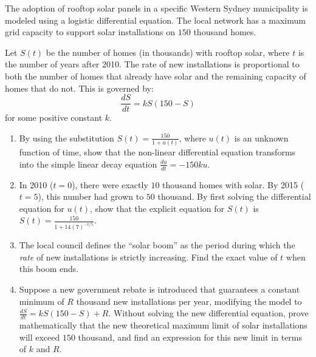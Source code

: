 \begin{problem}
The adoption of rooftop solar panels in a specific Western Sydney municipality is modeled using a logistic differential equation. The local network has a maximum grid capacity to support solar installations on $150$ thousand homes. 

Let $S(t)$ be the number of homes (in thousands) with rooftop solar, where $t$ is the number of years after 2010. The rate of new installations is proportional to both the number of homes that already have solar and the remaining capacity of homes that do not. This is governed by:
\[ \frac{dS}{dt} = kS(150 - S) \]
for some positive constant $k$.

\begin{enumerate}
    \item[\textbf{i}] By using the substitution $S(t) = \frac{150}{1 + u(t)}$, where $u(t)$ is an unknown function of time, show that the non-linear differential equation transforms into the simple linear decay equation $\frac{du}{dt} = -150ku$. 
    \item[\textbf{ii}] In 2010 ($t=0$), there were exactly $10$ thousand homes with solar. By 2015 ($t=5$), this number had grown to $50$ thousand. By first solving the differential equation for $u(t)$, show that the explicit equation for $S(t)$ is $S(t) = \frac{150}{1 + 14(7)^{-t/5}}$.
    \item[\textbf{iii}] The local council defines the ``solar boom'' as the period during which the \textit{rate} of new installations is strictly increasing. Find the exact value of $t$ when this boom ends.
    \item[\textbf{iv}] Suppose a new government rebate is introduced that guarantees a constant minimum of $R$ thousand new installations per year, modifying the model to $\frac{dS}{dt} = kS(150-S) + R$. Without solving the new differential equation, prove mathematically that the new theoretical maximum limit of solar installations will exceed $150$ thousand, and find an expression for this new limit in terms of $k$ and $R$.
\end{enumerate}
\end{problem}

